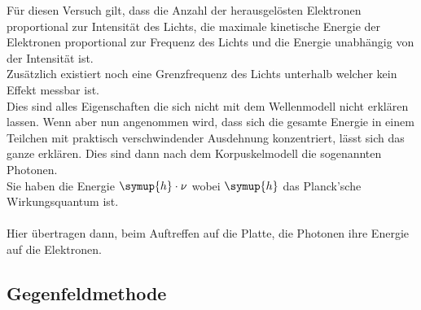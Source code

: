         \noindent Für diesen Versuch gilt, dass die Anzahl der herausgelösten Elektronen proportional zur Intensität des Lichts, 
        die maximale kinetische Energie der Elektronen proportional zur Frequenz des Lichts und die Energie unabhängig von der Intensität ist.\\
        Zusätzlich existiert noch eine Grenzfrequenz des Lichts unterhalb welcher kein Effekt messbar ist.\\
        Dies sind alles Eigenschaften die sich nicht mit dem Wellenmodell nicht erklären lassen. Wenn aber nun angenommen wird, 
        dass sich die gesamte Energie in einem Teilchen mit praktisch verschwindender Ausdehnung konzentriert, lässt sich das ganze erklären.
        Dies sind dann nach dem Korpuskelmodell die sogenannten Photonen.\\
        Sie haben die Energie $\symup{h}\cdot \nu$ wobei $\symup{h}$ das Planck'sche Wirkungsquantum\cite{Planck} ist.\\\\
        \noindent Hier übertragen dann, beim Auftreffen auf die Platte, die Photonen ihre Energie auf die Elektronen.
        




    \subsection{Gegenfeldmethode}